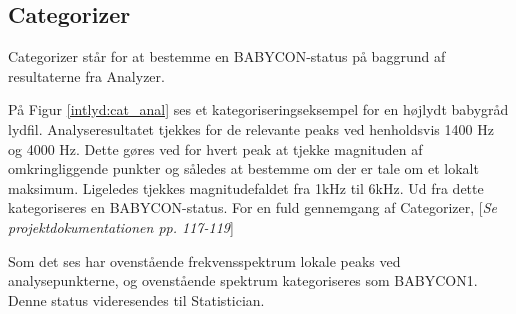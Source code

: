 \subsection{Categorizer}
Categorizer står for at bestemme en BABYCON-status på baggrund af resultaterne fra Analyzer. 

På Figur \ref{intlyd:cat_anal} ses et kategoriseringseksempel for en højlydt babygråd lydfil. Analyseresultatet tjekkes for de relevante peaks ved henholdsvis 1400 Hz og 4000 Hz. Dette gøres ved for hvert peak at tjekke magnituden af omkringliggende punkter og således at bestemme om der er tale om et lokalt maksimum. Ligeledes tjekkes magnitudefaldet fra 1kHz til 6kHz. Ud fra dette kategoriseres en BABYCON-status. For en fuld gennemgang af Categorizer, [\textit{Se projektdokumentationen pp. 117-119}]


Som det ses har ovenstående frekvensspektrum lokale peaks ved analysepunkterne, og ovenstående spektrum kategoriseres som BABYCON1. Denne status videresendes til Statistician. 